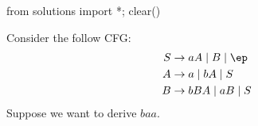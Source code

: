 
\newcommand\FIRST{\mathsc{First}}
\newcommand\FOLLOW{\mathsc{Follow}}

\begin{python0}
from solutions import *; clear()
\end{python0}

\begin{eg}
  Consider the follow CFG:
  \begin{align*}
    S &\rightarrow aA \mid B \mid \ep \\
    A &\rightarrow a \mid bA \mid S \\
    B &\rightarrow bBA \mid aB \mid S
  \end{align*}
  Suppose we want to derive $baa$.
\end{eg}

